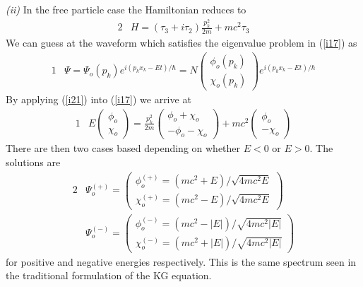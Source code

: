 \documentclass[]{article}
\numberwithin{equation}{subsection}
\begin{document}
\noindent \emph{(ii)} In the free particle case the Hamiltonian reduces to
\begin{alignat}{2}
  \label{i20} &H=(\tau_{3}+i\tau_{2})\frac{p_{k}^{2}}{2m}+mc^{2}\tau_{3}
\end{alignat}
We can guess at the waveform which satisfies the eigenvalue problem in (\ref{i17}) as
\begin{alignat}{1}
  \label{i21} &\Psi=\Psi_{o}(p_{k})e^{i(p_{k}x_{k}-Et)/\hbar}=N
  \begin{pmatrix}
    \phi_{o}(p_{k})\\
    \chi_{o}(p_{k})
  \end{pmatrix}e^{i(p_{k}x_{k}-Et)/\hbar}
\end{alignat}
By applying (\ref{i21}) into (\ref{i17}) we arrive at
\begin{alignat}{1}
  \label{i22} &E
  \begin{pmatrix}
    \phi_{o}\\
    \chi_{o}
  \end{pmatrix}=\frac{p_{k}^{2}}{2m}
  \begin{pmatrix}
    \phi_{o}+\chi_{o}\\
    -\phi_{o}-\chi_{o}
  \end{pmatrix}+mc^{2}
  \begin{pmatrix}
    \phi_{o}\\
    -\chi_{o}
  \end{pmatrix}
\end{alignat}
There are then two cases based depending on whether $E<0$ or $E>0$. The solutions are
\begin{alignat}{2}
  \label{i23} &\Psi_{o}^{(+)}=
  \begin{pmatrix}
    \phi_{o}^{(+)}=(mc^{2}+E)/\sqrt{4mc^{2}E}\\
    \chi_{o}^{(+)}=(mc^{2}-E)/\sqrt{4mc^{2}E}
  \end{pmatrix}\\
  \label{i24} &\Psi_{o}^{(-)}=
  \begin{pmatrix}
    \phi_{o}^{(-)}=(mc^{2}-|E|)/\sqrt{4mc^{2}|E|}\\
    \chi_{o}^{(-)}=(mc^{2}+|E|)/\sqrt{4mc^{2}|E|}
  \end{pmatrix}
\end{alignat}
for positive and negative energies respectively. This is the same spectrum seen in the traditional formulation of the KG equation.\\
\end{document}
